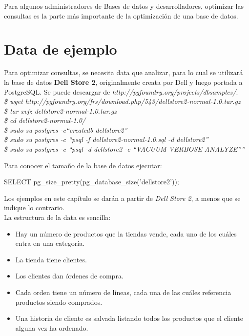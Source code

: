 Para algunos administradores de Bases de datos y desarrolladores, optimizar las consultas es la parte más importante de la optimización de una base de datos. 

\section{Data de ejemplo}

Para optimizar consultas, se necesita data que analizar, para lo cual se utilizará la base de datos \textbf{Dell Store 2}, originalmente creata por Dell y luego portada a PostgreSQL. Se puede descargar de \emph{http://pgfoundry.org/projects/dbsamples/}.\\

\emph{\$ wget http://pgfoundry.org/frs/download.php/543/dellstore2-normal-1.0.tar.gz\\
\$ tar xvfz dellstore2-normal-1.0.tar.gz\\
\$ cd dellstore2-normal-1.0/\\
\$ sudo su postgres -c``createdb dellstore2''\\
\$ sudo su postgres -c ``psql -f dellstore2-normal-1.0.sql -d dellstore2''\\
\$ sudo su postgres -c ``psql -d dellstore2 -c ``VACUUM VERBOSE ANALYZE''''\\
}

Para conocer el tamaño de la base de datos ejecutar:\\

\begin{pyglist}
SELECT pg_size_pretty(pg_database_size('dellstore2'));
\end{pyglist}

Los ejemplos en este capítulo se darán a partir de \textit{Dell Store 2}, a menos que se indique lo contrario. \cite{GregorySmith2010}\\

La estructura de la data es sencilla:

\begin{itemize}
\item Hay un número de productos que la tiendas vende, cada uno de los cuáles entra en una categoría.
\item La tienda tiene clientes.
\item Los clientes dan órdenes de compra.
\item Cada orden tiene un número de líneas, cada una de las cuáles referencia productos siendo comprados.
\item Una historia de cliente es salvada listando todos los productos que el cliente alguna vez ha ordenado.
\end{itemize}

